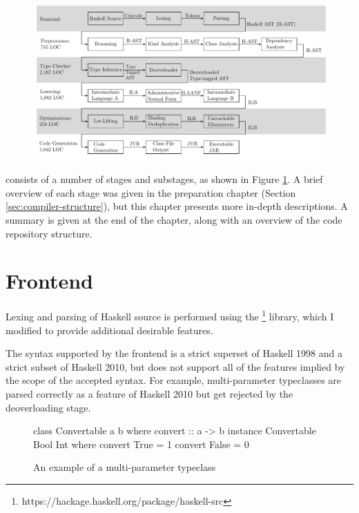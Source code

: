\documentclass[dissertation.tex]{subfiles}
\begin{document}
\begin{figure}[h]
    \includegraphics[width=\textwidth]{figures/compiler_layout.pdf}
    \caption{}
    \label{fig:compiler-layout}
\end{figure}

\compilername consists of a number of stages and substages, as shown in Figure \ref{fig:compiler-layout}. A brief overview of each stage was given in the preparation chapter (Section \ref{sec:compiler-structure}), but this chapter presents more in-depth descriptions. A summary is given at the end of the chapter, along with an overview of the code repository structure.

\section{Frontend}
{
    Lexing and parsing of Haskell source is performed using the \footnote{https://hackage.haskell.org/package/haskell-src} library, which I modified to provide additional desirable features.

    The syntax supported by the frontend is a strict superset of Haskell 1998 and a strict subset of Haskell 2010, but \compilername does not support all of the features implied by the scope of the accepted syntax. For example, multi-parameter typeclasses are parsed correctly as a feature of Haskell 2010 but get rejected by the deoverloading stage.

    \begin{figure}[h]
        \begin{haskellfigure}
        class Convertable a b where
            convert :: a -> b
        instance Convertable Bool Int where
            convert True = 1
            convert False = 0
        \end{haskellfigure}
        \caption{An example of a multi-parameter typeclass}
    \end{figure}
}
\end{document}
